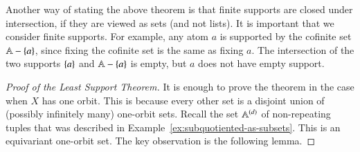 Another way of stating the above theorem is that finite supports are closed under intersection, if they are viewed as sets (and not lists).
 It is important that we consider finite supports. For example, any atom $a$ is supported by the cofinite set $\mathbb A - \{a\}$, since fixing the cofinite set is the same as fixing $a$. The intersection of the two supports $\{a\}$ and $\mathbb A - \{a\}$ is empty, but $a$ does not have empty support. 
\begin{proof}[Proof of the Least Support Theorem] It is enough to prove the theorem in the case when $X$ has one orbit. This is because every other set is a disjoint union  of (possibly infinitely many) one-orbit sets. 
    Recall the set  $\mathbb A^{(d)}$ of non-repeating tuples that was described in Example~\ref{ex:subquotiented-as-subsets}. This is an equivariant one-orbit set. The key observation is the following lemma.


\end{proof}
